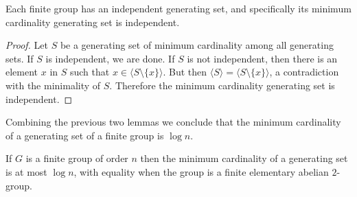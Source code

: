 \documentclass{article}
\newcommand{\gen}[1]{\langle #1 \rangle}
\begin{document}
\begin{lemma}
  Each finite group has an independent generating set, and specifically its minimum cardinality generating set is independent.
\end{lemma}
\begin{proof}
  Let $S$ be a generating set of minimum cardinality among all generating sets.
  If $S$ is independent, we are done.
  If $S$ is not independent, then there is an element $x$ in $S$ such that $x \in \gen{S \setminus \{x\}}$.
  But then $\gen{S} = \gen{S \setminus \{x\}}$, a contradiction with the minimality of $S$.
  Therefore the minimum cardinality generating set is independent.
\end{proof}

Combining the previous two lemmas we conclude that the minimum cardinality of a generating set of a finite group is $\log n$.

\begin{lemma}\label{lem:log}
  If $G$ is a finite group of order $n$ then the minimum cardinality of a generating set is at most $\log n$, with equality when the group is a finite elementary abelian $2$-group.
\end{lemma}

\end{document}
